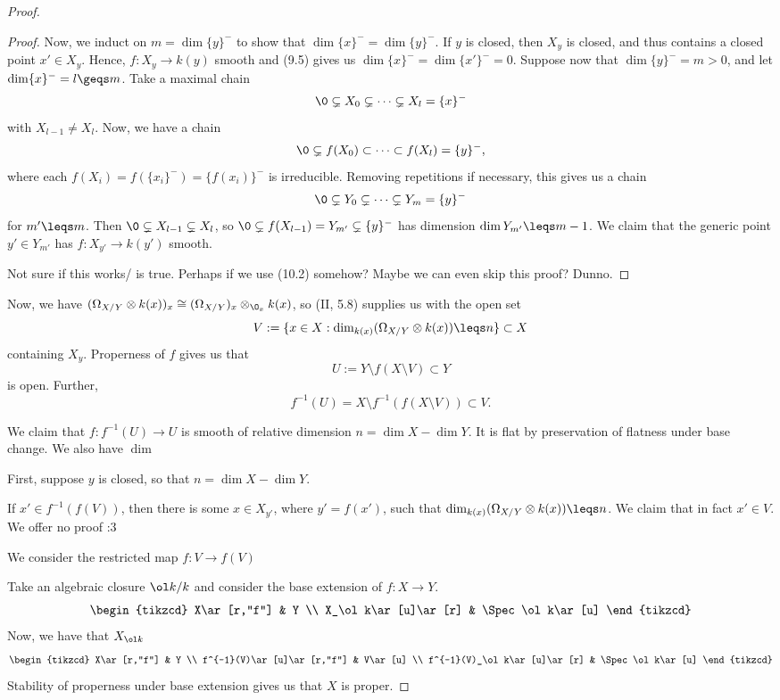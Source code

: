 \documentclass[12pt]{amsart}
\begin{document}
\begin{proof}
\begin{proof}
    Now, we induct on $m=\dim\{y\}^-$ to show that $\dim\{x\}^-=\dim\{y\}^-$.
    If $y$ is closed, then $X_y$ is closed, and thus contains a closed point $x'\in X_y$.
    Hence, $f:X_y\to k(y)$ smooth and (9.5) gives us $\dim\{x\}^-=\dim\{x'\}^-=0$.
    Suppose now that $\dim\{y\}^-=m>0$, and let $\dim\{x\}^-=l\geqs m$.
    Take a maximal chain
    \[
      \0\subsetneq X_0\subsetneq\cdots\subsetneq X_l=\{x\}^-
    \] 
    with $X_{l-1}\neq X_l$.
    Now, we have a chain
    \[
      \0\subsetneq f(X_0)\subset\cdots \subset f(X_l) = \{y\}^-,
    \] 
    where each $f(X_i)=f(\{x_i\}^-)=\{f(x_i)\}^-$ is irreducible.
    Removing repetitions if necessary, this gives us a chain
    \begin{align*}
      \0\subsetneq Y_0\subsetneq\cdots\subsetneq Y_{m}=\{y\}^-
    \end{align*}
    for $m'\leqs m$.
    Then $\0\subsetneq X_{l-1}\subsetneq X_l$, so $\0\subsetneq f(X_{l-1})=Y_{m'}\subsetneq \{y\}^-$ has dimension $\dim Y_{m'}\leqs m-1$.
    We claim that the generic point $y'\in Y_{m'}$ has $f:X_{y'}\to k(y')$ smooth.

    Not sure if this works/ is true.
    Perhaps if we use (10.2) somehow?
    Maybe we can even skip this proof? Dunno.
  \end{proof}

  Now, we have $(\Omega_{X/Y}\otimes k(x))_x \cong (\Omega_{X/Y})_x\otimes_{\O_x}k(x)$, so (II, 5.8) supplies us with the open set
  \[
    V:=\{x\in X: \dim_{k(x)}(\Omega_{X/Y}\otimes k(x))\leqs n\}\subset X
  \] 
  containing $X_y$.
  Properness of $f$ gives us that
  \[
    U:=Y\setminus f(X\setminus V)\subset Y
  \] 
  is open.
  Further,
  \[
    f^{-1}(U) = X\setminus f^{-1}(f(X\setminus V))\subset V.
  \] 

  We claim that $f:f^{-1}(U)\to U$ is smooth of relative dimension $n=\dim X-\dim Y$.
  It is flat by preservation of flatness under base change.
  We also have $\dim$ 

  First, suppose $y$ is closed, so that $n=\dim X-\dim Y$.


  If $x'\in f^{-1}(f(V))$, then there is some $x\in X_{y'}$, where $y'=f(x')$, such that $\dim_{k(x)}(\Omega_{X/Y}\otimes k(x))\leqs n$.
  We claim that in fact $x'\in V$.
  We offer no proof :3

  We consider the restricted map $f:V\to f(V)$

  Take an algebraic closure $\ol k/k$ and consider the base extension of $f:X\to Y$.
  \[
    \begin{tikzcd}
      X\ar[r,"f"] & Y \\
      X_\ol k\ar[u]\ar[r] & \Spec \ol k\ar[u]
    \end{tikzcd}
  \] 
  Now, we have that $X_{\ol k}$
  \[
    \begin{tikzcd}
      X\ar[r,"f"] & Y \\
      f^{-1}(V)\ar[u]\ar[r,"f"] & V\ar[u] \\
      f^{-1}(V)_\ol k\ar[u]\ar[r] & \Spec \ol k\ar[u]
    \end{tikzcd}
  \] 
  Stability of properness under base extension gives us that $X$ is proper.
\end{proof}
\end{document}
